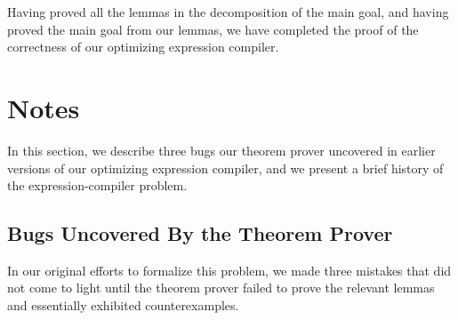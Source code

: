 \documentclass[10pt]{book}
\begin{document}
Having proved all the lemmas in the decomposition of the
main goal, and having proved the main goal from our lemmas,
we have completed the proof
of the correctness
of our optimizing expression compiler.
\section{Notes}
\label{SSCOMPILERNOTES}
In this section, we describe
three bugs our theorem prover uncovered in earlier versions
of our optimizing expression compiler,
and we present a brief history of the expression-compiler problem.

\subsection{Bugs Uncovered By the Theorem Prover}
In our original efforts to formalize this problem, we made three 
mistakes that did not come to light until the theorem prover
failed to prove the  relevant lemmas and essentially exhibited counterexamples.
\end{document}

